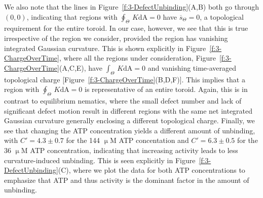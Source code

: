 We also note that the lines in Figure~\ref{f:3-DefectUnbinding}(A,B) both go through $(0,0)$, indicating that regions with $\oint_{\Theta}\,K\textrm{dA} = 0$ have $\overbar{s}_{\Theta} = 0$, a topological requirement for the entire toroid.
In our case, however, we see that this is true irrespective of the region we consider, provided the region has vanishing integrated Gaussian curvature.
This is shown explicitly in Figure~\ref{f:3-ChargeOverTime}, where all the regions under consideration, Figure~\ref{f:3-ChargeOverTime}(A,C,E), have $\int_{\Theta}\,K\textrm{dA} = 0$ and vanishing time-averaged topological charge [Figure~\ref{f:3-ChargeOverTime}(B,D,F)].
This implies that a region with $\oint_{\Theta}\,K\textrm{dA} = 0$ is representative of an entire toroid.
Again, this is in contrast to equilibrium nematics, where the small defect number and lack of significant defect motion result in different regions with the same net integrated Gaussian curvature generally enclosing a different topological charge.
Finally, we see that changing the ATP concentration yields a different amount of unbinding, with $C' = 4.3 \pm 0.7$ for the 144 $\upmu$M ATP concentation and $C' = 6.3 \pm 0.5$ for the 36 $\upmu$M ATP concentration, indicating that increasing activity leads to less curvature-induced unbinding.
This is seen explicitly in Figure~\ref{f:3-DefectUnbinding}(C), where we plot the data for both ATP concentrations to emphasize that ATP and thus activity is the dominant factor in the amount of unbinding.
